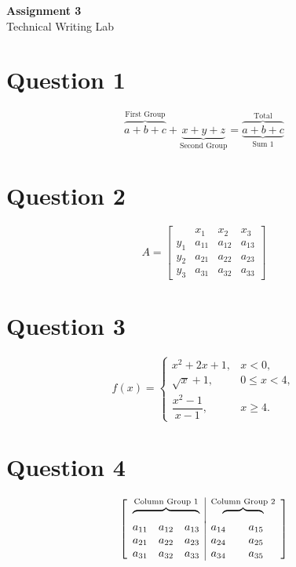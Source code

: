 \documentclass[12pt,a4paper]{article}
\begin{document}
\begin{center}
    {\LARGE\bfseries Assignment 3}\\[4pt]
    {\large Technical Writing Lab}
\end{center}

\section*{Question 1}
\[
\overbrace{a+b+c}^{\text{First Group}}
+
\underbrace{x+y+z}_{\text{Second Group}}
=
\underbrace{\overbrace{a+b+c}^{\text{Total}}}_{\text{Sum 1}}
\]

\section*{Question 2}
\[
A=
\left[
\begin{array}{c|ccc}
 & x_1 & x_2 & x_3\\
\hline
y_1 & a_{11} & a_{12} & a_{13}\\
y_2 & a_{21} & a_{22} & a_{23}\\
y_3 & a_{31} & a_{32} & a_{33}
\end{array}
\right]
\]

\section*{Question 3}
\[
f(x)=
\begin{cases}
x^2+2x+1, & x<0,\\[4pt]
\sqrt{x}+1, & 0\leq x<4,\\[4pt]
\dfrac{x^2-1}{x-1}, & x\geq 4.
\end{cases}
\]

\section*{Question 4}
\[
\left[
\begin{array}{ccc|cc}
\multicolumn{3}{c|}{\overbrace{\phantom{a_{11}\quad a_{12}\quad a_{13}}}^{\text{Column Group 1}}}
&
\multicolumn{2}{c}{\overbrace{\phantom{a_{14}\quad a_{15}}}^{\text{Column Group 2}}}
\\[-2pt]
a_{11} & a_{12} & a_{13} & a_{14} & a_{15}\\
a_{21} & a_{22} & a_{23} & a_{24} & a_{25}\\
a_{31} & a_{32} & a_{33} & a_{34} & a_{35}
\end{array}
\right]
\]
\end{document}
